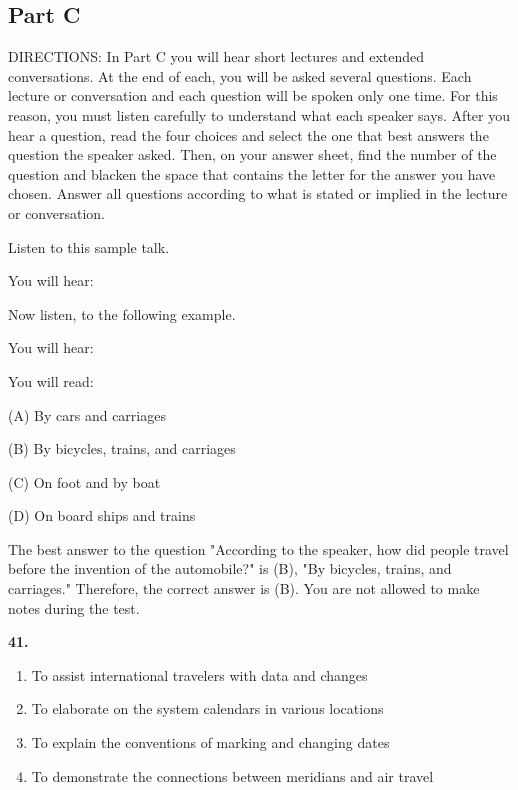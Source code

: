 \documentclass[12pt]{article}
\begin{document}
\subsection*{Part C}
DIRECTIONS: In Part C you will hear short lectures and extended conversations. At the end of each, you will be asked several questions. Each lecture or conversation and each question will be spoken only one time. For this reason, you must listen carefully to understand what each speaker says. After you hear a question, read the four choices and select the one that best answers the question the speaker asked. Then, on your answer sheet, find the number of the question and blacken the space that contains the letter for the answer you have chosen. Answer all questions according to what is stated or implied in the lecture or conversation.\par
\begin{exampleblock}
Listen to this sample talk.\par
You will hear:\par
Now listen, to the following example.\par
You will hear:\par
You will read:\par
(A) By cars and carriages\par
(B) By bicycles, trains, and carriages\par
(C) On foot and by boat\par
(D) On board ships and trains\par
The best answer to the question "According to the speaker, how did people travel before the invention of the automobile?" is (B), "By bicycles, trains, and carriages." Therefore, the correct answer is (B). You are not allowed to make notes during the test.\par
\end{exampleblock}
\noindent\textbf{41.}
\begin{enumerate}[label=(\Alph*),leftmargin=*,itemsep=0.2em]
\item To assist international travelers with data and changes
\item To elaborate on the system calendars in various locations
\item To explain the conventions of marking and changing dates
\item To demonstrate the connections between meridians and air travel
\end{enumerate}
\par
\vspace{0.25\baselineskip}
\end{document}
